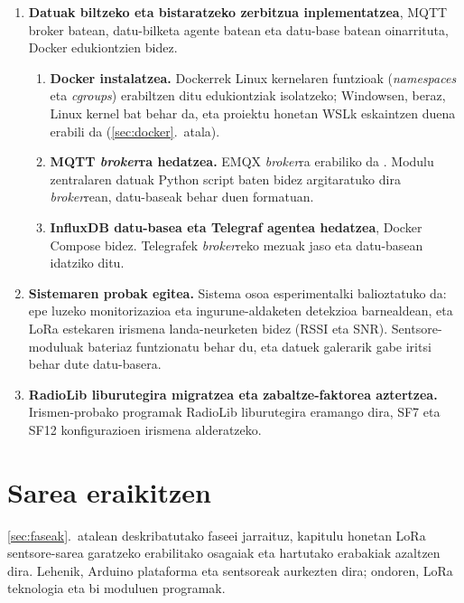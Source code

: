 \documentclass[10pt]{article}
\begin{document}
\begin{enumerate}
\item \textbf{Datuak biltzeko eta bistaratzeko zerbitzua inplementatzea}, \ac{MQTT} broker batean, datu-bilketa agente batean eta datu-base batean oinarrituta, Docker edukiontzien bidez.
  \begin{enumerate}
    \item \textbf{Docker instalatzea.} Dockerrek Linux kernelaren funtzioak (\textit{namespaces} eta \textit{cgroups}) erabiltzen ditu edukiontziak isolatzeko; Windowsen, beraz, Linux kernel bat behar da, eta proiektu honetan \ac{WSL}k eskaintzen duena erabili da (\ref{sec:docker}.~atala).
    \item \textbf{\ac{MQTT} \textit{broker}ra hedatzea.} EMQX \textit{broker}ra erabiliko da \cite{bender2021open}. Modulu zentralaren datuak Python script baten bidez argitaratuko dira \textit{broker}rean, datu-baseak behar duen formatuan.
    \item \textbf{InfluxDB datu-basea eta Telegraf agentea hedatzea}, Docker Compose bidez. Telegrafek \textit{broker}reko mezuak jaso eta datu-basean idatziko ditu.
  \end{enumerate}

\item \textbf{Sistemaren probak egitea.} Sistema osoa esperimentalki balioztatuko da: epe luzeko monitorizazioa eta ingurune-aldaketen detekzioa barnealdean, eta \ac{LoRa} estekaren irismena landa-neurketen bidez (\acs{RSSI} eta \acs{SNR}). Sentsore-moduluak bateriaz funtzionatu behar du, eta datuek galerarik gabe iritsi behar dute datu-basera.

\item \textbf{RadioLib liburutegira migratzea eta zabaltze-faktorea aztertzea.} Irismen-probako programak RadioLib liburutegira eramango dira, SF7 eta SF12 konfigurazioen irismena alderatzeko.
\end{enumerate}

\clearpage
\section{Sarea eraikitzen}
\label{chp:arduinoplakakLoRabidezkomunikatzea}

\ref{sec:faseak}.~atalean deskribatutako faseei jarraituz, kapitulu honetan \ac{LoRa} sentsore-sarea garatzeko erabilitako osagaiak eta hartutako erabakiak azaltzen dira. Lehenik, Arduino plataforma eta sentsoreak aurkezten dira; ondoren, \ac{LoRa} teknologia eta bi moduluen programak.\\
\end{document}
